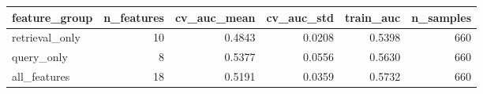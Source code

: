 \begin{tabular}{lrrrrr}
\toprule
feature_group & n_features & cv_auc_mean & cv_auc_std & train_auc & n_samples \\
\midrule
retrieval_only & 10 & 0.4843 & 0.0208 & 0.5398 & 660 \\
query_only & 8 & 0.5377 & 0.0556 & 0.5630 & 660 \\
all_features & 18 & 0.5191 & 0.0359 & 0.5732 & 660 \\
\bottomrule
\end{tabular}
